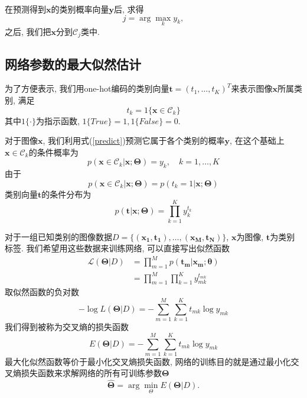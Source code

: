 在预测得到$\boldsymbol{x}$的类别概率向量$\boldsymbol{y}$后, 求得
\begin{equation}
    j = \arg \max_k y_k,
\end{equation}
之后, 我们把$\boldsymbol{x}$分到$\mathcal{C}_j$类中.


\subsection{网络参数的最大似然估计}
为了方便表示, 我们用one-hot编码的类别向量$\boldsymbol{t} = (t_1, \dots, t_K)^T$来表示图像$\boldsymbol{x}$所属类别, 满足
\begin{equation}
    t_k = 1\{\boldsymbol{x} \in \mathcal{C}_k\}
\end{equation}
其中$1\{\cdot\}$为指示函数, $1\{True\} = 1, 1\{False\}=0$.

对于图像$\boldsymbol{x}$, 我们利用式(\ref{predict})预测它属于各个类别的概率$\boldsymbol{y}$, 在这个基础上$\boldsymbol{x} \in \mathcal{C}_k$的条件概率为
\begin{equation}
    p(\boldsymbol{x} \in \mathcal{C}_k | \boldsymbol{x} ; \boldsymbol{\Theta}) = y_k, \quad k = 1, \dots, K
\end{equation}
由于
\begin{equation}
p(\boldsymbol{x} \in \mathcal{C}_k | \boldsymbol{x} ; \boldsymbol{\Theta}) = p(t_k = 1 | \boldsymbol{x} ; \boldsymbol{\Theta})
\end{equation}
类别向量$\boldsymbol{t}$的条件分布为
\begin{equation}
    p(\boldsymbol{t} | \boldsymbol{x} ; \boldsymbol{\Theta}) = \prod_{k=1}^K y_k^{t_k}
\end{equation}

对于一组已知类别的图像数据$D = \{(\boldsymbol{x_1}, \boldsymbol{t_1}), \dots, (\boldsymbol{x_M}, \boldsymbol{t_N})\}$, $\boldsymbol{x}$为图像, $\boldsymbol{t}$为类别标签. 我们希望用这些数据来训练网络, 可以直接写出似然函数
\begin{equation}
    \begin{aligned}
        \mathcal{L}(\boldsymbol{\Theta} | D) &= \prod_{m=1}^M p(\boldsymbol{t_m} | \boldsymbol{x_m} ; \boldsymbol{\theta})\\
        &= \prod_{m=1}^M \prod_{k=1}^K y_{mk}^{t_{mk}}
    \end{aligned}
\end{equation}
取似然函数的负对数
\begin{equation}
    -\log L(\boldsymbol{\Theta} | D) = -\sum_{m=1}^M \sum_{k=1}^K t_{mk} \log y_{mk}
\end{equation}
我们得到被称为交叉熵的损失函数
\begin{equation}
    E(\boldsymbol{\Theta} | D) = -\sum_{m=1}^M \sum_{k=1}^K t_{mk} \log y_{mk}
\end{equation}
最大化似然函数等价于最小化交叉熵损失函数, 网络的训练目的就是通过最小化交叉熵损失函数来求解网络的所有可训练参数$\boldsymbol{\Theta}$
\begin{equation}
    \hat{\boldsymbol{\Theta}} = \arg \min_{\Theta} E(\boldsymbol{\Theta} | D).
\end{equation}

